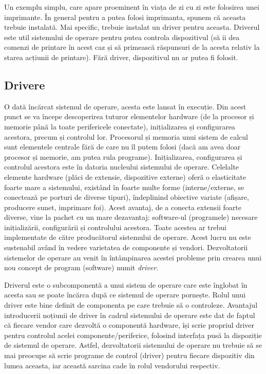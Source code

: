 Un exemplu simplu, care apare proeminent în viața de zi cu zi este folosirea
unei imprimante. În general pentru a putea folosi imprimanta, spunem că aceasta
trebuie instalată. Mai specific, trebuie instalat un driver pentru aceasta.
Driverul este util sistemului de operare pentru putea controla dispozitivul (să
ii dea comenzi de printare în acest caz și să primească răspunsuri de la acesta
relativ la starea acțiunii de printare). Fără driver, dispozitivul nu ar putea
fi folosit.

\subsection{Drivere}
\label{sec:hw:os-interact:driver}

O dată încărcat sistemul de operare, acesta este lansat în execuție. Din acest
punct se va începe descoperirea tuturor elementelor hardware (de la procesor și
memorie până la toate perifericele conectate), inițializarea și configurarea
acestora, precum și controlul lor. Procesorul și memoria unui sistem de calcul
sunt elementele centrale fără de care nu îl putem folosi (dacă am avea doar
procesor și memorie, am putea rula programe). Inițializarea, configurarea și
controlul acestora este în datoria nucleului sistemului de operare. Celelalte
elemente hardware (plăci de extensie, dispozitive externe) oferă o elasticitate
foarte mare a sistemului, existând în foarte multe forme (interne/externe, se
conectează pe porturi de diverse tipuri), îndeplinind obiective variate
(afișare, producere sunet, imprimare foi). Acest avantaj, de a conecta extensii
foarte diverse, vine la pachet cu un mare dezavantaj: software-ul (programele)
necesare inițializării, configurării și controlului acestora. Toate acestea ar
trebui implementate de către producătorul sistemului de operare. Acest lucru nu
este sustenabil având în vedere varietatea de componente și vendori.
Dezvoltatorii sistemelor de operare au venit în întâmpinarea acestei probleme
prin crearea unui nou concept de program (software) numit \textit{driver}.

Driverul este o subcomponentă a unui sistem de operare care este înglobat în
acesta sau se poate încărca după ce sistemul de operare pornește. Rolul unui
driver este bine definit de componenta pe care trebuie să o controleze.
Avantajul introducerii noțiunii de driver în cadrul sistemului de operare este
dat de faptul că fiecare vendor care dezvoltă o componentă hardware, își scrie
propriul driver pentru controlul acelei componente/periferice, folosind interfața
pusă la dispoziție de sistemul de operare. Astfel, dezvoltatorii sistemului de
operare nu trebuie să se mai preocupe să scrie programe de control (driver)
pentru fiecare dispozitiv din lumea aceasta, iar această sarcina cade în rolul
vendorului respectiv.

